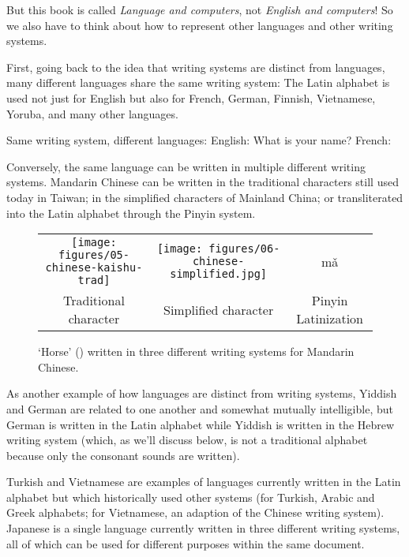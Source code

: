 But this book is called \emph{Language and computers}, not \emph{English and computers}!  So we also have to think about how to represent other languages and other writing systems.


First, going back to the idea that writing systems are distinct from languages, many different languages share the same writing system: The Latin alphabet is used not just for English but also for French, German, Finnish,  Vietnamese, Yoruba, and many other languages.  


\ea   Same writing system, different languages:
\ea   English: What is your name? 
\ex   French: 
\z 
\z 
 
Conversely, the same language can be written in multiple different writing systems.  Mandarin Chinese can be written in the traditional characters still used today in Taiwan; in the simplified characters of Mainland China; or transliterated into the Latin alphabet through the Pinyin system.  

\begin{figure}
    \begin{tabular}{ccc}
      \texttt{[image: figures/05-chinese-kaishu-trad]} &
      \texttt{[image: figures/06-chinese-simplified.jpg]} & 
            \Large{m\v{a}}  \\

       Traditional character & Simplified character & Pinyin Latinization \\ 
    \end{tabular}
    \caption{`Horse' () written in three different writing systems for Mandarin Chinese.}
    \label{fig:samelg:diffwriting}
\end{figure}


As another example of how languages are distinct from writing systems, Yiddish and German are related to one another and somewhat mutually intelligible, but German is written in the Latin alphabet while Yiddish is written in the Hebrew writing system (which, as we'll discuss below, is not a traditional alphabet because only the consonant sounds are written).

Turkish and Vietnamese are examples of languages  currently written in the Latin alphabet but which historically used other systems (for Turkish, Arabic and Greek alphabets; for Vietnamese, an adaption of the Chinese writing system).   Japanese is a single language currently written in three different writing systems, all of which can be used for different purposes within the same document.  %



